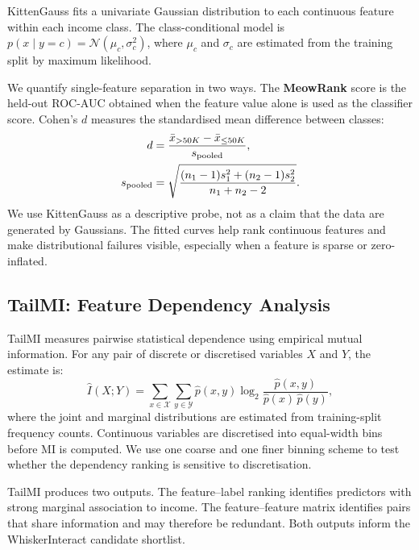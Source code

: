 \documentclass[11pt]{article}
\begin{document}
KittenGauss fits a univariate Gaussian distribution to each continuous feature within each income class. The class-conditional model is $p(x \mid y = c) = \mathcal{N}(\mu_c, \sigma_c^2)$, where $\mu_c$ and $\sigma_c$ are estimated from the training split by maximum likelihood.

We quantify single-feature separation in two ways. The \textbf{MeowRank} score is the held-out ROC-AUC obtained when the feature value alone is used as the classifier score. Cohen's $d$ \citep{cohen1988statistical} measures the standardised mean difference between classes:
\begin{align}
  d &= \frac{\bar{x}_{>50K} - \bar{x}_{\leq 50K}}{s_{\text{pooled}}},
  \label{eq:cohend} \\
  s_{\text{pooled}} &= \sqrt{\frac{(n_1-1)s_1^2 + (n_2-1)s_2^2}{n_1+n_2-2}}.
  \notag
\end{align}
We use KittenGauss as a descriptive probe, not as a claim that the data are generated by Gaussians. The fitted curves help rank continuous features and make distributional failures visible, especially when a feature is sparse or zero-inflated.

\subsection{TailMI: Feature Dependency Analysis}
\label{sec:tailmi}

TailMI measures pairwise statistical dependence using empirical mutual information. For any pair of discrete or discretised variables $X$ and $Y$, the estimate is:
\begin{equation}
  \hat{I}(X;Y)
  = \sum_{x \in \mathcal{X}} \sum_{y \in \mathcal{Y}}
    \hat{p}(x,y) \log_2 \frac{\hat{p}(x,y)}{\hat{p}(x)\,\hat{p}(y)},
  \label{eq:mi}
\end{equation}
where the joint and marginal distributions are estimated from training-split frequency counts. Continuous variables are discretised into equal-width bins before MI is computed. We use one coarse and one finer binning scheme to test whether the dependency ranking is sensitive to discretisation.

TailMI produces two outputs. The feature--label ranking identifies predictors with strong marginal association to income. The feature--feature matrix identifies pairs that share information and may therefore be redundant. Both outputs inform the WhiskerInteract candidate shortlist.
\end{document}
